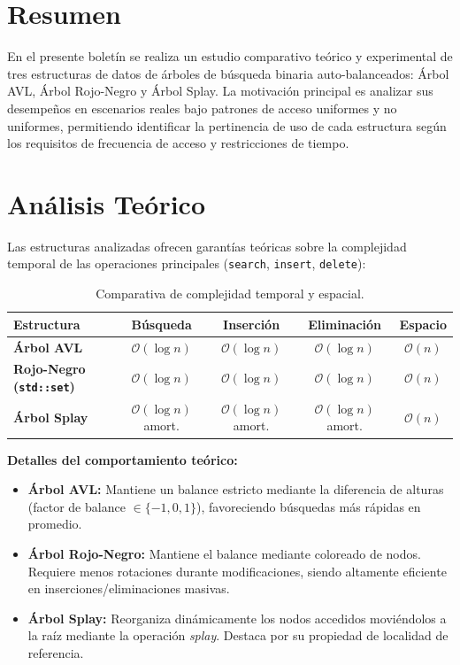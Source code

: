 \documentclass[11pt,a4paper]{article}
\begin{document}
\section{Resumen}
En el presente boletín se realiza un estudio comparativo teórico y experimental de tres estructuras de datos de árboles de búsqueda binaria auto-balanceados: Árbol AVL, Árbol Rojo-Negro y Árbol Splay. La motivación principal es analizar sus desempeños en escenarios reales bajo patrones de acceso uniformes y no uniformes, permitiendo identificar la pertinencia de uso de cada estructura según los requisitos de frecuencia de acceso y restricciones de tiempo.

\section{Análisis Teórico}
Las estructuras analizadas ofrecen garantías teóricas sobre la complejidad temporal de las operaciones principales (\texttt{search}, \texttt{insert}, \texttt{delete}):

\begin{table}[h!]
    \centering
    \caption{Comparativa de complejidad temporal y espacial.}
    \label{tab:complejidad_teorica}
    \begin{tabular}{lcccc}
        \toprule
        \textbf{Estructura} & \textbf{Búsqueda} & \textbf{Inserción} & \textbf{Eliminación} & \textbf{Espacio} \\
        \midrule
        \textbf{Árbol AVL} & $\mathcal{O}(\log n)$ & $\mathcal{O}(\log n)$ & $\mathcal{O}(\log n)$ & $\mathcal{O}(n)$ \\
        \textbf{Rojo-Negro (\texttt{std::set})} & $\mathcal{O}(\log n)$ & $\mathcal{O}(\log n)$ & $\mathcal{O}(\log n)$ & $\mathcal{O}(n)$ \\
        \textbf{Árbol Splay} & $\mathcal{O}(\log n)$ amort. & $\mathcal{O}(\log n)$ amort. & $\mathcal{O}(\log n)$ amort. & $\mathcal{O}(n)$ \\
        \bottomrule
    \end{tabular}
\end{table}

\noindent
\textbf{Detalles del comportamiento teórico:}
\begin{itemize}
    \item \textbf{Árbol AVL:} Mantiene un balance estricto mediante la diferencia de alturas (factor de balance $\in \{-1,0,1\}$), favoreciendo búsquedas más rápidas en promedio.
    \item \textbf{Árbol Rojo-Negro:} Mantiene el balance mediante coloreado de nodos. Requiere menos rotaciones durante modificaciones, siendo altamente eficiente en inserciones/eliminaciones masivas.
    \item \textbf{Árbol Splay:} Reorganiza dinámicamente los nodos accedidos moviéndolos a la raíz mediante la operación \emph{splay}. Destaca por su propiedad de localidad de referencia.
\end{itemize}
\end{document}
